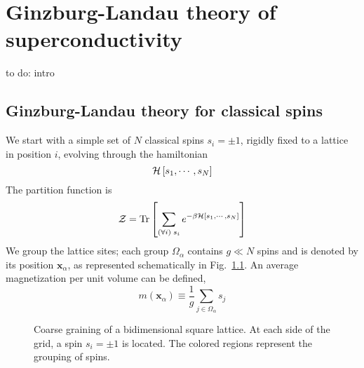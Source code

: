 \chapter{Ginzburg-Landau theory of superconductivity}\label{chap:ginzburg-landau theory of superconductivity}\chaptertoc{}

{\color{red}to do: intro}

\section{Ginzburg-Landau theory for classical spins}\label{sec:ginzburg-landau theory for classical spins}

We start with a simple set of $N$ classical spins $s_i = \pm 1$, rigidly fixed to a lattice in position $i$, evolving through the hamiltonian
\[
    \mathcal{H}\left[{s_1, \cdots, s_N}\right]
\]
The partition function is
\[
    \mathcal{Z} = \Tr\left[{\sum_{(\forall i) \; s_i} e^{-\beta \mathcal{H} \left[{s_1, \cdots, s_N}\right]} }\right]
\]
We group the lattice sites; each group $\Omega_\alpha$ contains $g \ll N$ spins and is denoted by its position $\mathbf{x}_\alpha$, as represented schematically in Fig.~\ref{fig:coarse graining of lattice}. An average magnetization per unit volume can be defined,
\[ 
    m(\mathbf{x}_\alpha) \equiv \frac{1}{g} \sum_{j \in \Omega_\alpha} s_j
\]

\begin{figure}
    \centering
    
    \caption{Coarse graining of a bidimensional square lattice. At each side of the grid, a spin $s_i = \pm 1$ is located. The colored regions represent the grouping of spins.}
    \label{fig:coarse graining of lattice}
\end{figure}

